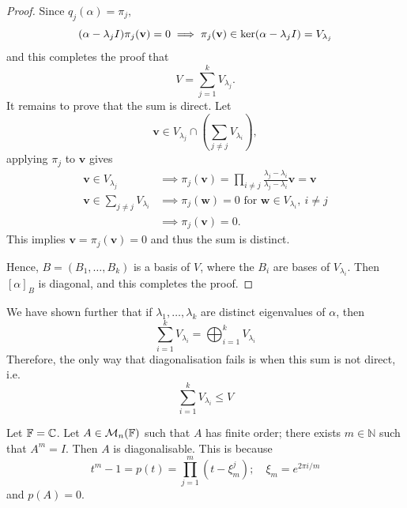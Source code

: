 \documentclass[a4paper]{article}
\begin{document}
\begin{proof}
	Since $ q_j(\alpha) = \pi_j, $
	\[
		(\alpha - \lambda_j I) \pi_j({\bf v}) = 0 \implies \pi_j({\bf v}) \in \ker(\alpha - \lambda_j I) = V_{\lambda_j}
	\]
	and this completes the proof that 
	\[
		V = \sum_{j=1}^{k} V_{\lambda_j}. 
	\]
	It remains to prove that the sum is direct. Let 
	\[
		\mathbf{v} \in V_{\lambda_j} \cap \left( \sum_{j\neq j} V_{\lambda_i} \right),
	\]
	applying $\pi_j$ to $\mathbf{v}$ gives 
	\begin{align*}
		\mathbf{v}\in V_{\lambda_j} &\implies \pi_j(\mathbf{v}) = \prod_{i\neq j} \frac{\lambda_j-\lambda_i}{\lambda_j-\lambda_i}\mathbf{v} = \mathbf{v}\\ 
		\mathbf{v}\in \sum_{j\neq j} V_{\lambda_i} &\implies \pi_j(\mathbf{w}) = 0 \text{ for } \mathbf{w} \in V_{\lambda_i},\ i\neq j\\ 
		&\implies \pi_j(\mathbf{v}) = 0. 
	\end{align*}
	This implies $ \mathbf{v} = \pi_j(\mathbf{v}) = 0 $ and thus the sum is distinct. 

	Hence, $ B = (B_1, \dots, B_k) $ is a basis of $ V $, where the $ B_i $ are bases of $ V_{\lambda_i} $.
	Then $ [\alpha]_B $ is diagonal, and this completes the proof. 
\end{proof} 

\begin{remark}
	We have shown further that if $ \lambda_1, \dots, \lambda_k $ are distinct eigenvalues of $ \alpha $, then
	\[
		\sum_{i=1}^k V_{\lambda_i} = \bigoplus_{i=1}^k V_{\lambda_i}
	\]
	Therefore, the only way that diagonalisation fails is when this sum is not direct, i.e.
	\[
		\sum_{i=1}^k V_{\lambda_i} \le V
	\]
\end{remark}

\begin{example}
	Let $ {\mathbb{F}} = \mathbb C $.
	Let $ A \in {\mathcal{M}}_n({\mathbb{F}}) $ such that $ A $ has finite order; there exists $ m \in \mathbb N $ such that $ A^m = I $.
	Then $ A $ is diagonalisable.
	This is because
	\[
		t^m - 1 = p(t) = \prod_{j=1}^m (t - \xi_m^j);\quad \xi_m = e^{2 \pi i/m}
	\]
	and $ p(A) = 0 $.
\end{example}
\end{document}
